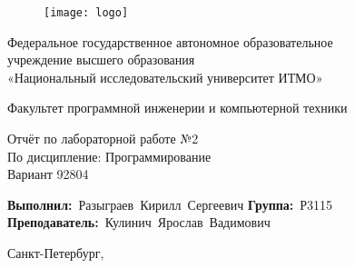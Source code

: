 \newcommand{\Faculty}{Факультет программной инженерии и компьютерной техники}

\newcommand{\TeacherPosition}{}
\newcommand{\TeacherName}{Кулинич Ярослав Вадимович}

\newcommand{\LabSubject}{Программирование}
\newcommand{\LabNumber}{№2}
\newcommand{\Variant}{92804}

\newcommand{\StudentGroup}{Р3115}
\newcommand{\StudentName}{Разыграев Кирилл Сергеевич}


\thispagestyle{empty}
\setlength{\parindent}{0cm} %

\begin{figure}[h]
	\centering
	\texttt{[image: logo]}
\end{figure}
\vspace{-\baselineskip}


\begin{center}
	Федеральное государственное автономное образовательное \\
	учреждение высшего образования\\
	«Национальный исследовательский университет ИТМО»
\end{center}\par

\begin{center}
	\vspace{12pt}
	\Faculty
\end{center}\par

\vspace{\fill}
\begin{center}
	Отчёт по лабораторной работе \LabNumber \\
	По дисципление: \LabSubject \\
	Вариант \Variant
\end{center}\par

\vspace{\fill}
\vbox{
	\hfill
	\vbox{
		\hbox{\textbf{Выполнил:} \StudentName}
		\hbox{\textbf{Группа:} \StudentGroup \\}
		\hbox{\textbf{Преподаватель:} \TeacherPosition \TeacherName}
	}
} 


\vspace{\fill}
\begin{center}
	Санкт-Петербург, \the\year{}
\end{center}\par

\newpage

\setlength{\parindent}{1.25cm} %
